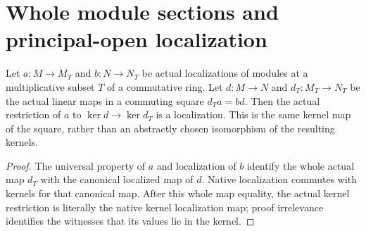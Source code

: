 \section{Whole module sections and principal-open localization}

\begin{lemma}
\label{lem:localized-module-kernel-square}
Let $a:M\to M_T$ and $b:N\to N_T$ be actual localizations of
modules at a multiplicative subset $T$ of a commutative ring.
Let $d:M\to N$ and $d_T:M_T\to N_T$ be the actual linear maps
in a commuting square $d_Ta=bd$. Then the actual restriction of
$a$ to $\ker d\to\ker d_T$ is a localization. This is the same
kernel map of the square, rather than an abstractly chosen
isomorphism of the resulting kernels.
\leanok
\end{lemma}
\begin{proof}
The universal property of $a$ and localization of $b$ identify the
whole actual map $d_T$ with the canonical localized map of $d$.
Native localization commutes with kernels for that canonical map.
After this whole map equality, the actual kernel restriction is
literally the native kernel localization map; proof irrelevance
identifies the witnesses that its values lie in the kernel.
\end{proof}

